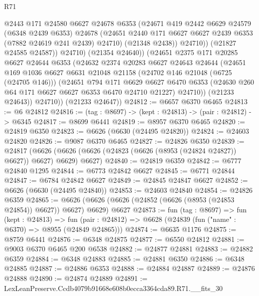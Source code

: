 \begin{lexlean}{R71}
\begin{coremodule}
                  @2443
                  @171
                  @24580
                  @6627
                  @24678
                  @6353
                  (@24671
                    @419
                    @2442
                    @6629
                    @24579
                    (@6348 @2439 @6353)
                    @24678
                    (@24651 @2440 @171 @6627 @6627 @2439 @6353 (@7882 @24619 @241 @2439) @24710)
                    (@21348 @2438))
                  @24710))
              (@21827 @24585 @24587))
            @24710)
          (@21354 @24640))
        (@24651
          @2375
          @171
          @20285
          @6627
          @24644
          @6353
          (@24632
            @2374
            @20283
            @6627
            @24643
            @24644
            (@24651
              @169
              @1036
              @6627
              @6631
              @21048
              @21158
              (@24702 @146 @21048 (@6725 (@24705 @146)))
              (@24651
                @794
                @171
                @6629
                @6627
                @6470
                @6353
                (@24630 @260 @64 @171 @6627 @6627 @6353 @6470 @24710 @21227)
                @24710))
            (@21233 @24643))
          @24710))
      (@21233 @24647))
@24812 := @6657 @6370 @6465
@24813 := @6 @24812
@24816 := (tag : @8697) -> (kept : @24813) -> (pair : @24812) -> @6345
@24817 := @8699 @6441
@24819 := @8957 @6370 @6465
@24820 := @24819 @6350
@24823 := @6626 (@6630 (@24495 @24820))
@24824 := @24603 @24820
@24826 := @9087 @6370 @6465
@24827 := @24826 @6350
@24839 := @24817
    (@6626 (@6626 (@6626 (@24823 (@6626 (@8953 (@24824 @24827)) @6627)) @6627) @6629) @6627)
@24840 := @24819 @6359
@24842 := @6777 @24840 @1295
@24844 := @6773 @24842 @6627
@24845 := @6771 @24844
@24847 := @6784 @24842 @6627
@24849 := @24845 @24847 @6627
@24852 := @6626 (@6630 (@24495 @24840))
@24853 := @24603 @24840
@24854 := @24826 @6359
@24865 := @6626 (@6626 (@6626 (@24852 (@6626 (@8953 (@24853 @24854)) @6627)) @6627) @6629) @6627
@24873 := fun (tag : @8697) =>
  fun (kept : @24813) =>
  fun (pair : @24812) => @6628 (@24839 (fun ("name" : @6370) => @8955 (@24849 @24865)))
@24874 := @6635 @1176
@24875 := @8759 @6441
@24876 := @6348 @24875
@24877 := @6550 @24812
@24881 := @9003 @6370 @6465 @200 @6538
@24882 := @24877 @24881
@24883 := @24882 @6359
@24884 := @6348 @24883
@24885 := @24881 @6350
@24886 := @6348 @24885
@24887 := @24886 @6353
@24888 := @24884 @24887
@24889 := @24876 @24888
@24890 := @24874 @24889
@24891 := LexLeanPreserve.Ccdb4079b91668e608b0ecca3364cda89.R71.__fits_30

\end{coremodule}
\end{lexlean}
